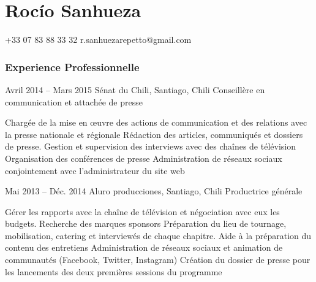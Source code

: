 \documentclass{tccv}
\begin{document}
\part{Roc\'io Sanhueza}


    {+33 07 83 88 33 32}
    {r.sanhuezarepetto@gmail.com}



\section{Experience Professionnelle}


     

\begin{eventlist}

\item{Avril 2014 -- Mars 2015}
     {Sénat du Chili, Santiago, Chili}
     {Conseillère en communication et attachée de presse}

    \begin{itemize}
      \setlength\itemsep{0cm} 
      \cvitem[\checkmark] Chargée de la mise en œuvre des actions de communication et des relations avec la presse nationale et régionale
      \cvitem[\checkmark] Rédaction des articles, communiqués et dossiers de presse. Gestion et supervision des interviews avec des chaînes de télévision
      \cvitem[\checkmark] Organisation des conférences de presse
      \cvitem[\checkmark] Administration de réseaux sociaux conjointement avec l’administrateur du site web
    \end{itemize}     
     


\item{Mai 2013 -- Déc. 2014}
     {Aluro producciones, Santiago, Chili}
     {Productrice générale}
    
    \begin{itemize}
      \setlength\itemsep{0cm} 
      \cvitem[\checkmark] Gérer les rapports avec la chaîne de télévision et négociation avec eux les budgets. Recherche des marques sponsors
      \cvitem[\checkmark] Préparation du lieu de tournage, mobilisation, catering et interviewés de chaque chapitre. Aide à la préparation du contenu des entretiens
      \cvitem[\checkmark] Administration de réseaux sociaux et animation de communautés (Facebook, Twitter, Instagram)
      \cvitem[\checkmark] Création du dossier de presse pour les lancements des deux premières sessions du programme


\end{itemize}
\end{eventlist}
\end{document}
